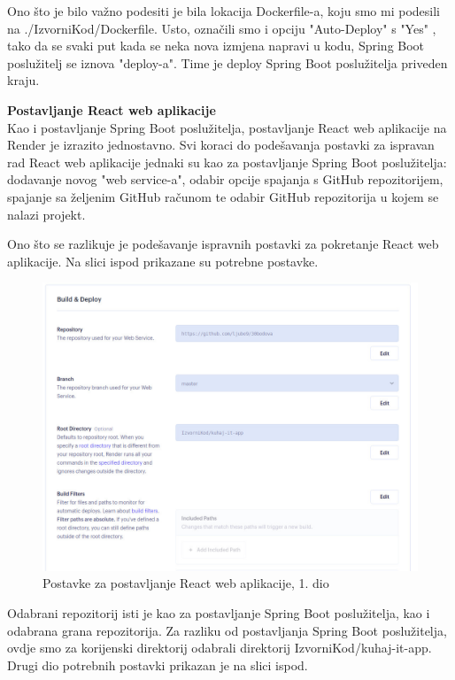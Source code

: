 		Ono što je bilo važno podesiti je bila lokacija Dockerfile-a, koju smo mi podesili na ./IzvorniKod/Dockerfile. Usto, označili smo i opciju "Auto-Deploy" s "Yes" , tako da se svaki put kada se neka nova izmjena napravi u kodu, Spring Boot poslužitelj se iznova "deploy-a". Time je deploy Spring Boot poslužitelja priveden kraju.
		
	\textbf{Postavljanje React web aplikacije} \\
	Kao i postavljanje Spring Boot poslužitelja, postavljanje React web aplikacije na Render je izrazito jednostavno. Svi koraci do podešavanja postavki za ispravan rad React web aplikacije jednaki su kao za postavljanje Spring Boot poslužitelja: dodavanje novog "web service-a", odabir opcije spajanja s GitHub repozitorijem, spajanje sa željenim GitHub računom te odabir GitHub repozitorija u kojem se nalazi projekt.
	
	Ono što se razlikuje je podešavanje ispravnih postavki za pokretanje React web aplikacije. Na slici ispod prikazane su potrebne postavke.
	
		\begin{figure}[H]
			\includegraphics[scale=0.4]{slike/Render_FRONTEND_1.JPG} %
			\centering
			\caption{Postavke za postavljanje React web aplikacije, 1. dio}
			\label{Postavke za postavljanje React web aplikacije, 1. dio}
		\end{figure}
		
	Odabrani repozitorij isti je kao za postavljanje Spring Boot poslužitelja, kao i odabrana grana repozitorija.
	Za razliku od postavljanja Spring Boot poslužitelja, ovdje smo za korijenski direktorij odabrali direktorij IzvorniKod/kuhaj-it-app. Drugi dio potrebnih postavki prikazan je na slici ispod.
	
